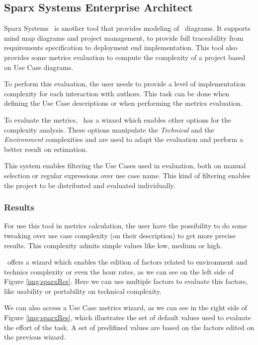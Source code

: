 \subsection{Sparx Systems Enterprise Architect}
Sparx Systems \entArch~is another tool that provides modeling of \uml\ diagrams.
It supports mind map diagrams and project management, to provide full traceability from requirements specification to deployment end implementation.
This tool also provides some metrics evaluation to compute the complexity of a project based on Use Case diagrams. 

To perform this evaluation, the user needs to provide a level of implementation complexity for each interaction with authors. 
This task can be done when defining the Use Case descriptions or when performing the metrics evaluation.

To evaluate the metrics, \entArch~has a wizard which enables other options for the complexity analysis.
These options manipulate the \emph{Technical} and the \emph{Environment} complexities and are used to adapt the evaluation and perform a better result on estimation.

This system enables filtering the Use Cases used in evaluation, both on manual selection or regular expressions over use case name.
This kind of filtering enables the project to be distributed and evaluated individually.

\subsubsection{Results}
For use this tool in metrics calculation, the user have the possibility to do some tweaking over use case complexity (on their description) to get more precise results.
This complexity admits simple values like low, medium or high.

\entArch~offers a wizard which enables the edition of factors related to environment and technics complexity or even the hour rates, as we can see on the left side of Figure \ref{img:sparxRes}.
Here we can use multiple factors to evaluate this factors, like usability or portability on technical complexity.

We can also access a Use Case metrics wizard, as we can see in the right side of Figure \ref{img:sparxRes}, which illustrates the set of default values used to evaluate the effort of the task.
A set of predifined values are based on the factors edited on the previous wizard.

